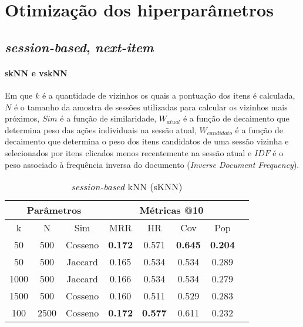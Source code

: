 \chapter{Otimização dos hiperparâmetros}

\section{\textit{session-based}, \textit{next-item}}
\subsubsection{skNN e vskNN}
Em que $k$ é a quantidade de vizinhos os quais a pontuação dos itens é
calculada, $N$ é o tamanho da amostra de sessões utilizadas para calcular os
vizinhos mais próximos, $Sim$ é a função de similaridade, $W_{atual}$ é a função
de decaimento que determina peso das ações individuais na sessão atual,
$W_{candidato}$ é a função de decaimento que determina o peso dos itens
candidatos de uma sessão vizinha e selecionados por itens clicados menos
recentemente na sessão atual e $IDF$ é o peso associado à frequência inversa do
documento (\textit{Inverse Document Frequency}).

\begin{table}[htbp]
    \centering
    \begin{tabular}{|c|c|c|c|c|c|c|c|}
      \hline
      \multicolumn{3}{|c|}{Parâmetros} & \multicolumn{4}{c|}{Métricas @10} \\
      \hline
      k & N & Sim & MRR & HR & Cov & Pop\\
      \hline
      50 & 500 & Cosseno & \textbf{0.172} & 0.571 & \textbf{0.645} & \textbf{0.204} \\
      \hline
      50 & 500 & Jaccard & 0.165 & 0.534 & 0.534 & 0.289 \\
      \hline
      1000 & 500 & Jaccard & 0.166 & 0.534 & 0.534 & 0.279 \\
      \hline
      1500 & 500 & Cosseno & 0.160 & 0.511 & 0.529 & 0.283 \\
      \hline
      100 & 2500 & Cosseno & \textbf{0.172} & \textbf{0.577} & 0.611 & 0.232 \\
      \hline
    \end{tabular}
    \caption{\textit{session-based} kNN (sKNN)}
  \end{table}

